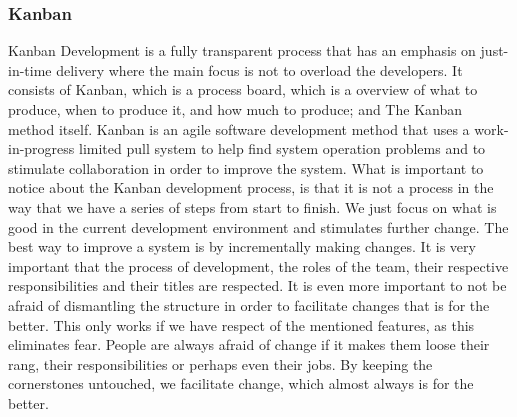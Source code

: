 \subsubsection{Kanban}
Kanban Development is a fully transparent process that has an emphasis on just-in-time delivery where the main focus is not to overload the developers\cite{bib:kanban}. It consists of Kanban, which is a process board, which is a overview of what to produce, when to produce it, and how much to produce; and The Kanban method itself.
\newline
\newline
Kanban is an agile software development method that uses a work-in-progress limited pull system to help find system operation problems and to stimulate collaboration in order to improve the system. What is important to notice about the Kanban development process, is that it is not a process in the way that we have a series of steps from start to finish. We just focus on what is good in the current development environment and stimulates further change. The best way to improve a system is by incrementally making changes.
\newline
\newline
It is very important that the process of development, the roles of the team, their respective responsibilities and their titles are respected. It is even more important to not be afraid of dismantling the structure in order to facilitate changes that is for the better. This only works if we have respect of the mentioned features, as this eliminates fear. People are always afraid of change if it makes them loose their rang, their responsibilities or perhaps even their jobs. By keeping the cornerstones untouched, we facilitate change, which almost always is for the better. 


